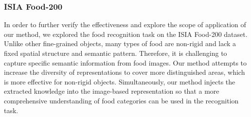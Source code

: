 \documentclass[5p,twocolumn]{elsarticle}
\begin{document}
\begin{table}[h]
\centering
\caption{Comparison results on NABirds dataset.}
\label{tab:nabirds}
\end{table}




\subsubsection{\textbf{ISIA Food-200}}
In order to further verify the effectiveness and explore the scope of application of our method, we explored the food recognition task on the ISIA Food-200 dataset. Unlike other fine-grained objects, many types of food are non-rigid and lack a fixed spatial structure and semantic pattern. Therefore, it is challenging to capture specific semantic information from food images. Our method attempts to increase the diversity of representations to cover more distinguished areas, which is more effective for non-rigid objects. Simultaneously, our method injects the extracted knowledge into the image-based representation so that a more comprehensive understanding of food categories can be used in the recognition task. 
\end{document}
